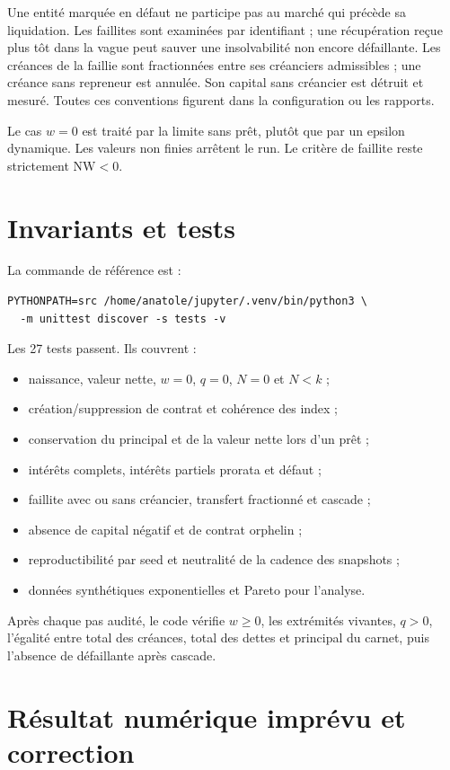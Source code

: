 \documentclass[11pt,a4paper]{article}
\begin{document}
Une entité marquée en défaut ne participe pas au marché qui précède sa
liquidation. Les faillites sont examinées par identifiant ; une récupération
reçue plus tôt dans la vague peut sauver une insolvabilité non encore défaillante.
Les créances de la faillie sont fractionnées entre ses créanciers admissibles ;
une créance sans repreneur est annulée. Son capital sans créancier est détruit et
mesuré. Toutes ces conventions figurent dans la configuration ou les rapports.

Le cas $w=0$ est traité par la limite sans prêt, plutôt que par un epsilon
dynamique. Les valeurs non finies arrêtent le run. Le critère de faillite reste
strictement $\mathrm{NW}<0$.

\section{Invariants et tests}

La commande de référence est :
\begin{verbatim}
PYTHONPATH=src /home/anatole/jupyter/.venv/bin/python3 \
  -m unittest discover -s tests -v
\end{verbatim}

Les 27 tests passent. Ils couvrent :
\begin{itemize}
  \item naissance, valeur nette, $w=0$, $q=0$, $N=0$ et $N<k$ ;
  \item création/suppression de contrat et cohérence des index ;
  \item conservation du principal et de la valeur nette lors d'un prêt ;
  \item intérêts complets, intérêts partiels prorata et défaut ;
  \item faillite avec ou sans créancier, transfert fractionné et cascade ;
  \item absence de capital négatif et de contrat orphelin ;
  \item reproductibilité par seed et neutralité de la cadence des snapshots ;
  \item données synthétiques exponentielles et Pareto pour l'analyse.
\end{itemize}

Après chaque pas audité, le code vérifie $w\geq0$, les extrémités vivantes,
$q>0$, l'égalité entre total des créances, total des dettes et principal du
carnet, puis l'absence de défaillante après cascade.

\section{Résultat numérique imprévu et correction}
\end{document}
